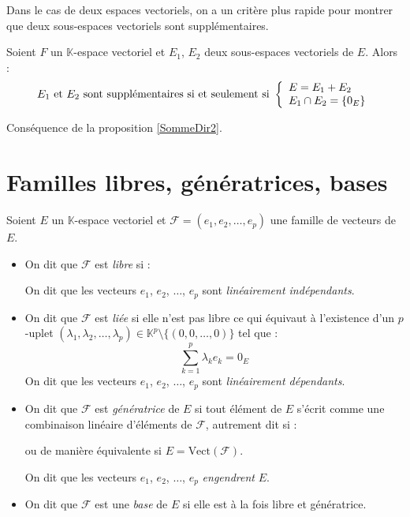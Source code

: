 \documentclass[a4paper,10pt]{report}
\begin{document}
Dans le cas de deux espaces vectoriels, on a un critère plus rapide pour montrer que deux sous-espaces vectoriels sont supplémentaires.

 \begin{Proposition}{}
 Soient $F$ un $\mathbb{K}$-espace vectoriel et $E_1$, $E_2$ deux sous-espaces vectoriels de $E$. Alors :
 $$ E_1 \hbox{ et } E_2 \hbox{ sont supplémentaires si et seulement si } \left\lbrace\begin{array}{l}
 E=E_1+ E_2 \\
 E_1 \cap E_2 = \lbrace 0_E \rbrace
 \end{array}\right.$$
 \end{Proposition}
 
 \begin{Demonstration}{}
 Conséquence de la proposition \ref{SommeDir2}.
 \end{Demonstration}
 \section{Familles libres, génératrices, bases}
 
 \begin{Definition}{}
Soient $E$ un $\mathbb{K}$-espace vectoriel et $\mathcal{F} = (e_1, e_2, \ldots, e_p)$ une famille de vecteurs de $E$.

\begin{itemize}
\item On dit que $\mathcal{F}$ est \emph{libre} si  :

\vspace{1cm}
%
On dit que les vecteurs $e_1$, $e_2$, $\ldots$, $e_p$ sont \emph{linéairement indépendants}.
\item On dit que $\mathcal{F}$ est \emph{liée} si elle n'est pas libre ce qui équivaut à l'existence d'un $p$-uplet \newline $(\lambda_1, \lambda_2, \ldots, \lambda_p) \in \mathbb{K}^p \setminus \lbrace (0,0, \ldots,0) \rbrace$ tel que :
$$ \sum_{k=1}^p \lambda_k e_k = 0_E$$
On dit que les vecteurs $e_1$, $e_2$, $\ldots$, $e_p$ sont \emph{linéairement dépendants}.
\item On dit que $\mathcal{F}$ est \emph{génératrice} de $E$ si tout élément de $E$ s'écrit comme une combinaison linéaire d'éléments de $\mathcal{F}$, autrement dit si :

\vspace{1cm}

ou de manière équivalente si $E = \textrm{Vect}(\mathcal{F})$.

On dit que les vecteurs $e_1$, $e_2$, $\ldots$, $e_p$ \emph{engendrent} $E$.
\item On dit que $\mathcal{F}$ est une \emph{base} de $E$ si elle est à la fois libre et génératrice.
\end{itemize}
\end{Definition}
\end{document}
